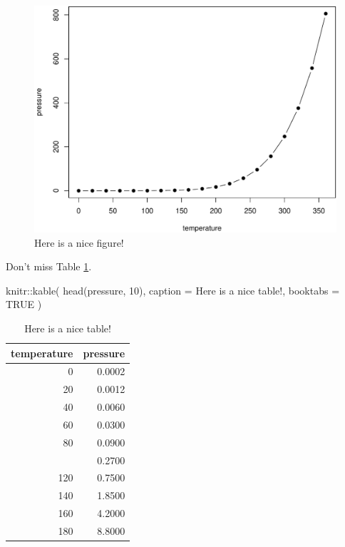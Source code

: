 \documentclass[
  12pt,
]{book}
\newenvironment{Shaded}{\begin{snugshade}}{\end{snugshade}}
\newcommand{\AttributeTok}[1]{\textcolor[rgb]{0.77,0.63,0.00}{#1}}
\newcommand{\ConstantTok}[1]{\textcolor[rgb]{0.00,0.00,0.00}{#1}}
\newcommand{\DecValTok}[1]{\textcolor[rgb]{0.00,0.00,0.81}{#1}}
\newcommand{\FunctionTok}[1]{\textcolor[rgb]{0.00,0.00,0.00}{#1}}
\newcommand{\NormalTok}[1]{#1}
\newcommand{\SpecialCharTok}[1]{\textcolor[rgb]{0.00,0.00,0.00}{#1}}
\newcommand{\StringTok}[1]{\textcolor[rgb]{0.31,0.60,0.02}{#1}}
\theoremstyle{definition}
\theoremstyle{definition}
\theoremstyle{definition}
\theoremstyle{definition}
\theoremstyle{remark}
\begin{document}
\begin{figure}

{\centering \includegraphics[width=0.8\linewidth]{figurasnice-fig-1} 

}

\caption{Here is a nice figure!}\label{fig:nice-fig}
\end{figure}

Don't miss Table \ref{tab:nice-tab}.

\begin{Shaded}
\begin{Highlighting}[]
\NormalTok{knitr}\SpecialCharTok{::}\FunctionTok{kable}\NormalTok{(}
  \FunctionTok{head}\NormalTok{(pressure, }\DecValTok{10}\NormalTok{), }\AttributeTok{caption =} \StringTok{\textquotesingle{}Here is a nice table!\textquotesingle{}}\NormalTok{,}
  \AttributeTok{booktabs =} \ConstantTok{TRUE}
\NormalTok{)}
\end{Highlighting}
\end{Shaded}

\begin{table}

\caption{\label{tab:nice-tab}Here is a nice table!}
\centering
\begin{tabular}[t]{rr}
\toprule
temperature & pressure\\
\midrule
0 & 0.0002\\
20 & 0.0012\\
40 & 0.0060\\
60 & 0.0300\\
80 & 0.0900\\
\addlinespace
100 & 0.2700\\
120 & 0.7500\\
140 & 1.8500\\
160 & 4.2000\\
180 & 8.8000\\
\bottomrule
\end{tabular}
\end{table}
\end{document}
